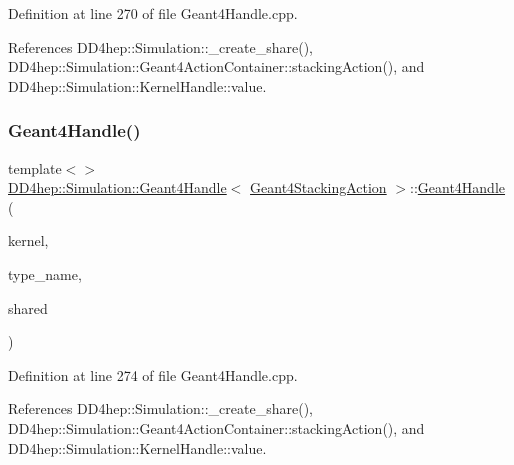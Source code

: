 Definition at line 270 of file Geant4\+Handle.\+cpp.



References D\+D4hep\+::\+Simulation\+::\+\_\+create\+\_\+share(), D\+D4hep\+::\+Simulation\+::\+Geant4\+Action\+Container\+::stacking\+Action(), and D\+D4hep\+::\+Simulation\+::\+Kernel\+Handle\+::value.

\hypertarget{class_d_d4hep_1_1_simulation_1_1_geant4_handle_ab390031f97b424ec92c174467874ae01}{}\label{class_d_d4hep_1_1_simulation_1_1_geant4_handle_ab390031f97b424ec92c174467874ae01} 
\subsubsection{\texorpdfstring{Geant4\+Handle()}{Geant4Handle()}\hspace{0.1cm}{\footnotesize\ttfamily [19/20]}}
{\footnotesize\ttfamily template$<$$>$ \\
\hyperlink{class_d_d4hep_1_1_simulation_1_1_geant4_handle}{D\+D4hep\+::\+Simulation\+::\+Geant4\+Handle}$<$ \hyperlink{class_d_d4hep_1_1_simulation_1_1_geant4_stacking_action}{Geant4\+Stacking\+Action} $>$\+::\hyperlink{class_d_d4hep_1_1_simulation_1_1_geant4_handle}{Geant4\+Handle} (\begin{DoxyParamCaption}\item[{\hyperlink{class_d_d4hep_1_1_simulation_1_1_geant4_kernel}{Geant4\+Kernel} \&}]{kernel,  }\item[{const char $\ast$}]{type\+\_\+name,  }\item[{bool}]{shared }\end{DoxyParamCaption})}



Definition at line 274 of file Geant4\+Handle.\+cpp.



References D\+D4hep\+::\+Simulation\+::\+\_\+create\+\_\+share(), D\+D4hep\+::\+Simulation\+::\+Geant4\+Action\+Container\+::stacking\+Action(), and D\+D4hep\+::\+Simulation\+::\+Kernel\+Handle\+::value.

\hypertarget{class_d_d4hep_1_1_simulation_1_1_geant4_handle_ab0d256729ec1d69372b9dd713de7f738}{}\label{class_d_d4hep_1_1_simulation_1_1_geant4_handle_ab0d256729ec1d69372b9dd713de7f738} 
